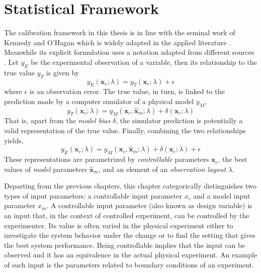 \section{Statistical Framework}\label{sec:bc_statistical_framework}

The calibration framework in this thesis is in line with the seminal work of Kennedy and O'Hagan \cite{Kennedy2001} which is widely adapted in the applied literature \cite{Bayarri2007,Higdon2008,Arendt2012,Reichert2012}.
Meanwhile its explicit formulation uses a notation adapted from different sources \cite{Kennedy2001,Santner2003,Reichert2012}.
Let $y_E$ be the experimental observation of a variable,
then its relationship to the true value $y_T$ is given by
\begin{equation}
    y_E(\bm{x}_c; \lambda) = y_T (\bm{x}_c; \lambda) + \epsilon
\label{eq:bc_observation_true}
\end{equation}
where $\epsilon$ is an observation error.
The true value, in turn, is linked to the prediction made by a computer simulator of a physical model $y_M$,
\begin{equation}
    y_T(\bm{x}_c; \lambda) = y_M (\bm{x}_c, \hat{\bm{x}}_m; \lambda) + \delta (\bm{x}_c; \lambda)
\label{eq:bc_true_simulation}
\end{equation}
That is, apart from the \emph{model bias} $\delta$, the simulator prediction is potentially a valid representation of the true value.
Finally, combining the two relationships yields,
\begin{equation}
    y_E(\bm{x}_c; \lambda) = y_M (\bm{x}_c, \hat{\bm{x}}_m; \lambda) + \delta (\bm{x}_c; \lambda) + \epsilon
\label{eq:bc_observation_true}
\end{equation}
These representations are parametrized by \emph{controllable} parameters $\bm{x}_c$,
the best values of \emph{model} parameters $\hat{\bm{x}}_m$, and an element of an \emph{observation layout} $\lambda$.

Departing from the previous chapters, this chapter categorically distinguishes two types of input parameters: a controllable input parameter $x_c$ and a model input parameter $x_m$.
A controllable input parameter (also known as design variable) is an input that, in the context of controlled experiment, can be controlled by the experimenter.
Its value is often varied in the physical experiment either to investigate the system behavior under the change or to find the setting that gives the best system performance. 
Being controllable implies that the input can be observed and it has an equivalence in the actual physical experiment.
An example of such input is the parameters related to boundary conditions of an experiment.

